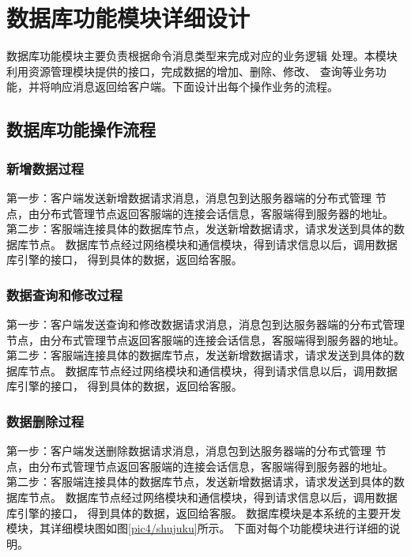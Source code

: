 \section{数据库功能模块详细设计}
数据库功能模块主要负责根据命令消息类型来完成对应的业务逻辑
处理。本模块利用资源管理模块提供的接口，完成数据的增加、删除、修改、
查询等业务功能，并将响应消息返回给客户端。下面设计出每个操作业务的流程。
\subsection{数据库功能操作流程}
\subsubsection{新增数据过程}
第一步：客户端发送新增数据请求消息，消息包到达服务器端的分布式管理
节点，由分布式管理节点返回客服端的连接会话信息，客服端得到服务器的地址。
第二步：客服端连接具体的数据库节点，发送新增数据请求，请求发送到具体的数据库节点。
数据库节点经过网络模块和通信模块，得到请求信息以后，调用数据库引擎的接口，
得到具体的数据，返回给客服。
\subsubsection{数据查询和修改过程}
第一步：客户端发送查询和修改数据请求消息，消息包到达服务器端的分布式管理
节点，由分布式管理节点返回客服端的连接会话信息，客服端得到服务器的地址。
第二步：客服端连接具体的数据库节点，发送新增数据请求，请求发送到具体的数据库节点。
数据库节点经过网络模块和通信模块，得到请求信息以后，调用数据库引擎的接口，
得到具体的数据，返回给客服。
\subsubsection{数据删除过程}
第一步：客户端发送删除数据请求消息，消息包到达服务器端的分布式管理
节点，由分布式管理节点返回客服端的连接会话信息，客服端得到服务器的地址。
第二步：客服端连接具体的数据库节点，发送新增数据请求，请求发送到具体的数据库节点。
数据库节点经过网络模块和通信模块，得到请求信息以后，调用数据库引擎的接口，
得到具体的数据，返回给客服。
数据库模块是本系统的主要开发模块，其详细模块图如图\ref{pic4/shujuku}所示。
下面对每个功能模块进行详细的说明。
